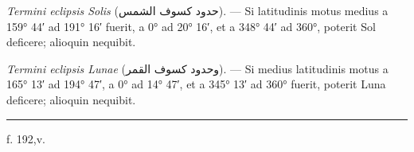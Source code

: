 \documentclass[11pt]{article}
\begin{document}
\noindent\hspace*{6mm}\parbox{\dimexpr\textwidth-12mm}{\setlength{\parindent}{6mm}\indent \textit{Termini eclipsis Solis} (\textarabic{حدود كسوف الشمس}). — Si latitudinis motus medius a 159° 44′ ad 191° 16′ fuerit, a 0° ad 20° 16′, et a 348° 44′ ad 360°, poterit Sol deficere; alioquin nequibit.}\par\vspace{1mm}
\noindent\hspace*{6mm}\parbox{\dimexpr\textwidth-12mm}{\setlength{\parindent}{6mm}\indent \textit{Termini eclipsis Lunae} (\textarabic{وحدود كسوف القمر}). — Si medius latitudinis motus a 165° 13′ ad 194° 47′, a 0° ad 14° 47′, et a 345° 13′ ad 360° fuerit, poterit Luna deficere; alioquin nequibit.}\par\vspace{1mm}
\clearpage
\noindent{}
\par\vspace{-1mm}\noindent\rule{\textwidth}{.4pt}\par\vspace{1mm}
\begin{center}{\small f. 192,v.}\end{center}\vspace{-3mm}
\end{document}
